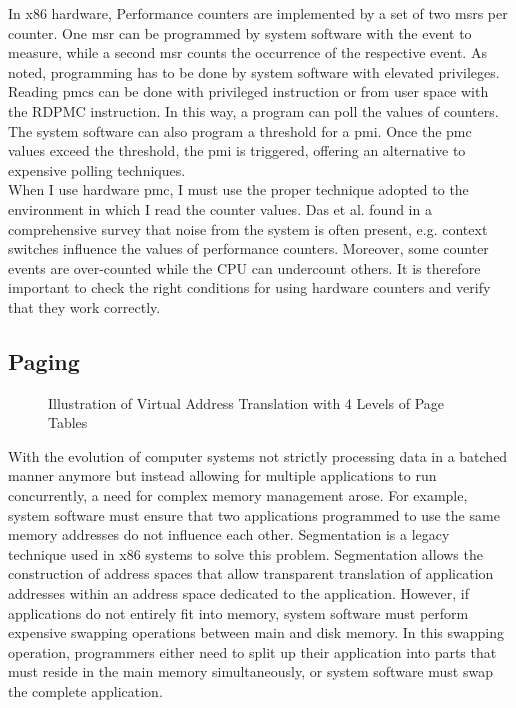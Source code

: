 In x86 hardware, Performance counters are implemented by a set of two
\glspl{msr} per counter. One \gls{msr} can be programmed by system software with
the event to measure, while a second \gls{msr} counts the occurrence of the
respective event. As noted, programming has to be done by system software with
elevated privileges. Reading \glspl{pmc} can be done with privileged instruction
or from user space with the RDPMC instruction. In this way, a program can poll
the values of counters. The system software can also program a threshold for a
\gls{pmi}. Once the \gls{pmc} values exceed the threshold, the \gls{pmi} is
triggered, offering an alternative to expensive polling techniques.\\

When I use hardware \gls{pmc}, I must use the proper technique adopted to
the environment in which I read the counter values. Das et al. found in a
comprehensive survey that noise from the system is often present, e.g. context
switches influence the values of performance counters. \cite{das_sok_2019}
Moreover, some counter events are over-counted while the CPU can undercount
others.\cite{weaver_non-determinism_2013} It is therefore important to check the
right conditions for using hardware counters and verify that they work
correctly.

\subsection{Paging}
\label{sec:state:technical:paging}
\begin{center}
    \begin{figure}
        
        \caption{Illustration of Virtual Address Translation with 4 Levels of Page Tables}
        \label{fig:state:technical:paging}
    \end{figure}
\end{center}

With the evolution of computer systems not strictly processing data in a batched
manner anymore but instead allowing for multiple applications to run
concurrently, a need for complex memory management arose. For example, system
software must ensure that two applications programmed to use the same memory
addresses do not influence each other. Segmentation is a legacy technique used
in x86 systems to solve this problem. Segmentation allows the construction of
address spaces that allow transparent translation of application addresses
within an address space dedicated to the application. However, if applications
do not entirely fit into memory, system software must perform expensive swapping
operations between main and disk memory. In this swapping operation, programmers
either need to split up their application into parts that must reside in the
main memory simultaneously, or system software must swap the complete
application.

